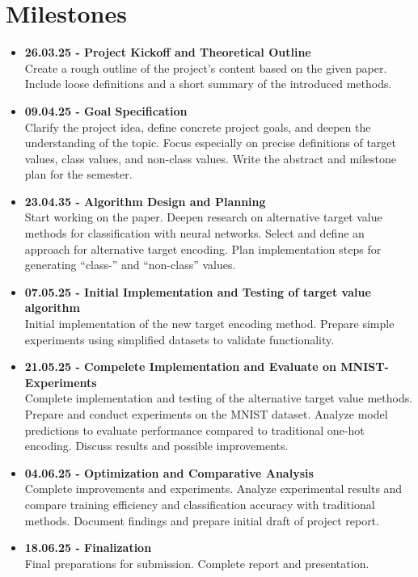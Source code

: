 \documentclass[12pt,fleqn,a4paper]{article}
\begin{document}
\section{Milestones} %
\begin{itemize}
\item {\textbf{26.03.25 - Project Kickoff and Theoretical Outline} \\ Create a rough outline of the project's content based on the given paper. Include loose definitions and a short summary of the introduced methods.}

\item{\textbf{09.04.25 - Goal Specification} \\ Clarify the project idea, define concrete project goals, and deepen the understanding of the topic. Focus especially on precise definitions of target values, class values, and non-class values. Write the abstract and milestone plan for the semester.}

\item{\textbf{23.04.35 - Algorithm Design and Planning} \\ Start working on the paper. Deepen research on alternative target value methods for classification with neural networks. Select and define an approach for alternative target encoding. Plan implementation steps for generating ``class-'' and ``non-class'' values.}

\item{\textbf{07.05.25 - Initial Implementation and Testing of target value algorithm} \\ Initial implementation of the new target encoding method. Prepare simple experiments using simplified datasets to validate functionality.}

\item{\textbf{21.05.25 - Compelete Implementation and Evaluate on MNIST-Experiments} \\ Complete implementation and testing of the alternative target value methods. Prepare and conduct experiments on the MNIST dataset. Analyze model predictions to evaluate performance compared to traditional one-hot encoding. Discuss results and possible improvements.}

\item{\textbf{04.06.25 - Optimization and Comparative Analysis} \\ Complete improvements and experiments. Analyze experimental results and compare training efficiency and classification accuracy with traditional methods. Document findings and prepare initial draft of project report.}

\item{\textbf{18.06.25 - Finalization} \\ Final preparations for submission. Complete report and presentation.}

\end{itemize}
\end{document}
